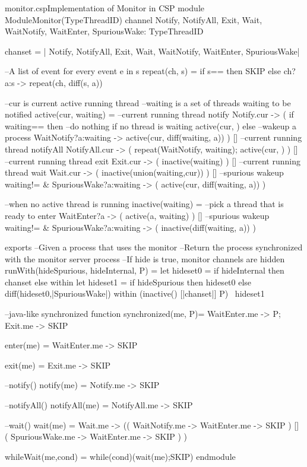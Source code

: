 \documentclass{article}
\begin{document}
\begin{cspfloat}{monitor.csp}{Implementation of Monitor in CSP}
  module ModuleMonitor(TypeThreadID)
  channel
    Notify, NotifyAll, Exit, Wait,
    WaitNotify, WaitEnter, SpuriousWake: TypeThreadID

  chanset = {| Notify, NotifyAll, Exit, Wait, WaitNotify, WaitEnter, SpuriousWake|}

  --A list of event for every event e in s
  repeat(ch, s) =
    if s=={} then SKIP
    else ch?a:s -> repeat(ch, diff(s, {a}))

  --cur is current active running thread
  --waiting is a set of threads waiting to be notified
  active(cur, waiting) =
    --current running thread notify
    Notify.cur -> (
      if waiting=={} then 
        --do nothing if no thread is waiting
        active(cur, {})
      else
        --wakeup a process
        WaitNotify?a:waiting -> 
        active(cur, diff(waiting, {a}))
    ) []
    --current running thread notifyAll
    NotifyAll.cur -> (
      repeat(WaitNotify, waiting);
      active(cur, {})
    ) []
    --current running thread exit
    Exit.cur -> (
      inactive(waiting)
    ) []
    --current running thread wait
    Wait.cur -> (
      inactive(union(waiting,{cur}))
    ) []
    --spurious wakeup
    waiting!={} & SpuriousWake?a:waiting -> (
      active(cur, diff(waiting, {a}))
    )

  --when no active thread is running
  inactive(waiting) = 
    --pick a thread that is ready to enter
    WaitEnter?a -> (
      active(a, waiting)
    ) []
    --spurious wakeup
    waiting!={} & SpuriousWake?a:waiting -> (
      inactive(diff(waiting, {a}))
    )

exports
  --Given a process that uses the monitor
  --Return the process synchronized with the monitor server process
  --If hide is true, monitor channels are hidden
  runWith(hideSpurious, hideInternal, P) = 
    let hideset0 = if hideInternal then chanset else {} within
    let hideset1 = if hideSpurious then hideset0 else diff(hideset0,{|SpuriousWake|}) within
    (inactive({}) [|chanset|] P) \ hideset1
  
  --java-like synchronized function
  synchronized(me, P)=
    WaitEnter.me ->
    P;
    Exit.me ->
    SKIP

  enter(me) = 
    WaitEnter.me ->
    SKIP

  exit(me) =
    Exit.me -> 
    SKIP

  --notify()
  notify(me) = 
    Notify.me ->
    SKIP

  --notifyAll()
  notifyAll(me) =
    NotifyAll.me ->
    SKIP

  --wait()
  wait(me) =
    Wait.me -> ((
        WaitNotify.me ->
        WaitEnter.me ->
        SKIP
      ) [] (
        SpuriousWake.me ->
        WaitEnter.me ->
        SKIP
      )
    )
  
  whileWait(me,cond) =
    while(cond)(wait(me);SKIP)
endmodule
\end{cspfloat}
\end{document}
